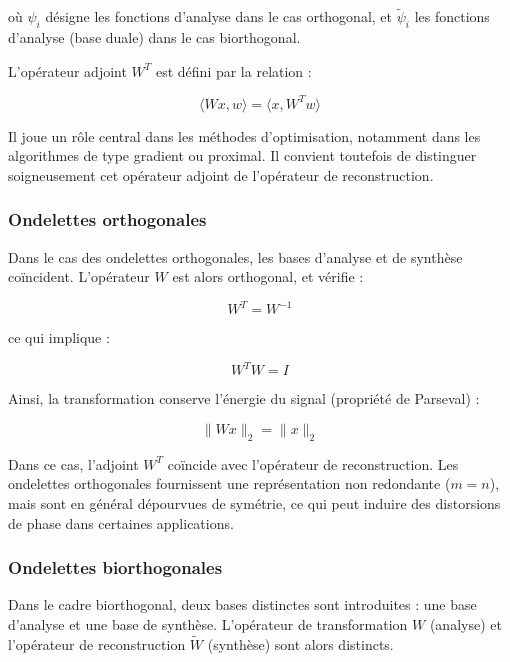 où $\psi_i$ désigne les fonctions d'analyse dans le cas orthogonal, et $\tilde{\psi}_i$ les fonctions d'analyse (base duale) dans le cas biorthogonal.

L'opérateur adjoint $W^T$ est défini par la relation :

\begin{equation}
\langle Wx, w \rangle = \langle x, W^T w \rangle
\end{equation}

Il joue un rôle central dans les méthodes d'optimisation, notamment dans les algorithmes de type gradient ou proximal. Il convient toutefois de distinguer soigneusement cet opérateur adjoint de l'opérateur de reconstruction.

\subsubsection{Ondelettes orthogonales}

Dans le cas des ondelettes orthogonales, les bases d'analyse et de synthèse coïncident. L'opérateur $W$ est alors orthogonal, et vérifie :

\begin{equation}
W^T = W^{-1}
\end{equation}

ce qui implique :

\begin{equation}
W^T W = I
\end{equation}

Ainsi, la transformation conserve l'énergie du signal (propriété de Parseval) :

\begin{equation}
\|Wx\|_2 = \|x\|_2
\end{equation}

Dans ce cas, l'adjoint $W^T$ coïncide avec l'opérateur de reconstruction. Les ondelettes orthogonales fournissent une représentation non redondante ($m = n$), mais sont en général dépourvues de symétrie, ce qui peut induire des distorsions de phase dans certaines applications.

\subsubsection{Ondelettes biorthogonales}

Dans le cadre biorthogonal, deux bases distinctes sont introduites : une base d'analyse et une base de synthèse. L'opérateur de transformation $W$ (analyse) et l'opérateur de reconstruction $\tilde{W}$ (synthèse) sont alors distincts.

